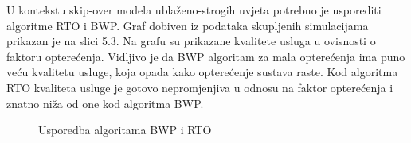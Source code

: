 \documentclass[../zavrsni.tex]{subfiles}
\begin{document}
U kontekstu skip-over modela ublaženo-strogih uvjeta potrebno je usporediti algoritme RTO i BWP. Graf dobiven iz podataka skupljenih simulacijama
prikazan je na slici 5.3. Na grafu su prikazane kvalitete usluga u ovisnosti o faktoru opterećenja. Vidljivo je da BWP algoritam za mala 
opterećenja ima puno veću kvalitetu usluge, koja opada kako opterećenje sustava raste. Kod algoritma RTO kvaliteta usluge je gotovo nepromjenjiva
u odnosu na faktor opterećenja i znatno niža od one kod algoritma BWP. 

\begin{figure}[!htb]
    \caption{\label{fig:my-label} Usporedba algoritama BWP i RTO}
\end{figure}
\end{document}
